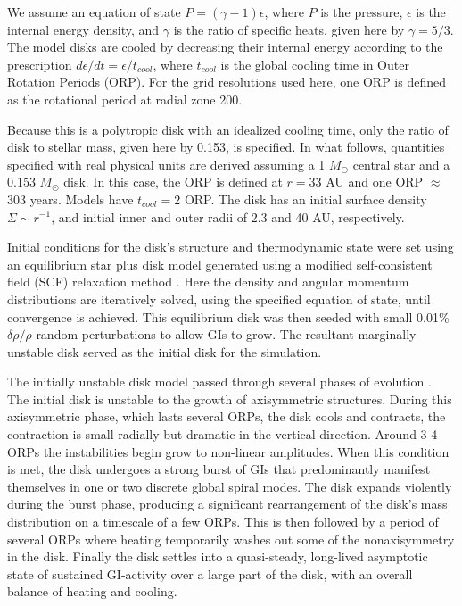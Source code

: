 \documentclass[manuscript]{aastex} %
\begin{document}
We assume an equation of state $P = (\gamma -1)\epsilon$, where $P$ is the pressure, $\epsilon$ is the internal energy density, and $\gamma$ is the ratio of specific heats, given here by $\gamma = 5/3$.  The model disks are cooled by decreasing their internal energy according to the prescription $d\epsilon/dt = \epsilon / t_{cool}$, where $t_{cool}$ is the global cooling time in Outer Rotation Periods (ORP).  For the grid resolutions used here, one ORP is defined as the rotational period at radial zone 200.


Because this is a polytropic disk with an idealized cooling time, only the ratio of disk to stellar mass, given here by 0.153, is specified.  In what follows, quantities specified with real physical units are derived assuming a 1 $M_\odot$ central star and a 0.153  $M_\odot$ disk. In this case, the ORP is defined at $r = 33$ AU and one ORP $\approx$ 303 years.  Models have $t_{cool} = 2$ ORP. The disk has an initial surface density $\Sigma \sim r^{ -1}$, and initial inner and outer radii of 2.3 and 40 AU, respectively.  

Initial conditions for the disk's structure and thermodynamic state were set using an equilibrium star plus disk model generated using a modified \citet{hachisu1986} self-consistent field (SCF) relaxation method \citep{pickett1996,pickett2003,mejiaphd2004,mejia2005,cai2006}. Here  the density and angular momentum distributions are iteratively solved, using the specified equation of state,  until convergence is achieved. This  equilibrium disk was then seeded with small 0.01\% $\delta\rho/\rho$ random perturbations to allow GIs to grow.  The resultant marginally unstable disk served as the initial disk for the simulation.

The initially unstable disk model passed through several phases of evolution \citep[see also][]{pickett2003, mejia2005}.  The initial disk is unstable to the growth of axisymmetric structures. During this axisymmetric phase, 
which lasts several ORPs, the disk cools and contracts, the contraction is small radially but dramatic in the vertical direction. Around 3-4 ORPs the instabilities begin grow to non-linear amplitudes. When this condition is met, the disk undergoes a strong burst of GIs that predominantly manifest themselves in one or two discrete global spiral modes.  The disk expands violently during the burst phase, producing a significant rearrangement of the disk's mass distribution on a timescale of a few ORPs. This is then followed by a period of several ORPs where heating temporarily washes out some of the nonaxisymmetry in the disk.  Finally the disk settles into a quasi-steady, long-lived asymptotic state of sustained GI-activity over a large part of the disk, with an overall balance of heating and cooling.
\end{document}
